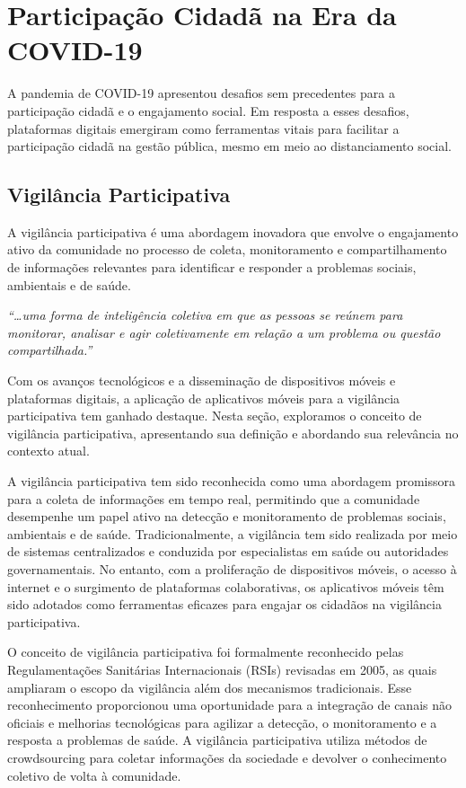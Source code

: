 \section{Participação Cidadã na Era da COVID-19}

A pandemia de COVID-19 apresentou desafios sem precedentes para a participação cidadã e o engajamento social. Em resposta a esses desafios, plataformas digitais emergiram como ferramentas vitais para facilitar a participação cidadã na gestão pública, mesmo em meio ao distanciamento social.

\subsection*{Vigilância Participativa}
A vigilância participativa é uma abordagem inovadora que envolve o engajamento ativo da comunidade no processo de coleta, monitoramento e compartilhamento de informações relevantes para identificar e responder a problemas sociais, ambientais e de saúde.

\begin{citacao}
	\textit{“…uma forma de inteligência coletiva em que as pessoas se reúnem para monitorar, analisar e agir coletivamente em relação a um problema ou questão compartilhada.”}
\end{citacao}

Com os avanços tecnológicos e a disseminação de dispositivos móveis e plataformas digitais, a aplicação de aplicativos móveis para a vigilância participativa tem ganhado destaque. Nesta seção, exploramos o conceito de vigilância participativa, apresentando sua definição e abordando sua relevância no contexto atual.

A vigilância participativa tem sido reconhecida como uma abordagem promissora para a coleta de informações em tempo real, permitindo que a comunidade desempenhe um papel ativo na detecção e monitoramento de problemas sociais, ambientais e de saúde. Tradicionalmente, a vigilância tem sido realizada por meio de sistemas centralizados e conduzida por especialistas em saúde ou autoridades governamentais. No entanto, com a proliferação de dispositivos móveis, o acesso à internet e o surgimento de plataformas colaborativas, os aplicativos móveis têm sido adotados como ferramentas eficazes para engajar os cidadãos na vigilância participativa.

O conceito de vigilância participativa foi formalmente reconhecido pelas Regulamentações Sanitárias Internacionais (RSIs) revisadas em 2005, as quais ampliaram o escopo da vigilância além dos mecanismos tradicionais. Esse reconhecimento proporcionou uma oportunidade para a integração de canais não oficiais e melhorias tecnológicas para agilizar a detecção, o monitoramento e a resposta a problemas de saúde. A vigilância participativa utiliza métodos de crowdsourcing para coletar informações da sociedade e devolver o conhecimento coletivo de volta à comunidade.\cite[1]{2017_Smolinski}

